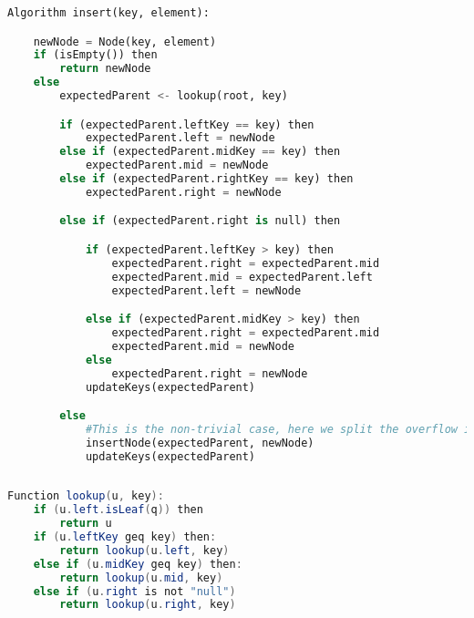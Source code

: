 \documentclass{report}
\begin{document}
\lstset{style=mystyle}
\begin{lstlisting}[language=Python]
Algorithm insert(key, element):

    newNode = Node(key, element)
    if (isEmpty()) then
        return newNode
    else
        expectedParent <- lookup(root, key)

        if (expectedParent.leftKey == key) then
            expectedParent.left = newNode
        else if (expectedParent.midKey == key) then
            expectedParent.mid = newNode
        else if (expectedParent.rightKey == key) then
            expectedParent.right = newNode

        else if (expectedParent.right is null) then

            if (expectedParent.leftKey > key) then
                expectedParent.right = expectedParent.mid
                expectedParent.mid = expectedParent.left
                expectedParent.left = newNode

            else if (expectedParent.midKey > key) then
                expectedParent.right = expectedParent.mid
                expectedParent.mid = newNode
            else
                expectedParent.right = newNode
            updateKeys(expectedParent)

        else
            #This is the non-trivial case, here we split the overflow into 2 nodes, and leave the smaller 2 at the current place, and carry on inserting upwards the tree recursively
            insertNode(expectedParent, newNode)
            updateKeys(expectedParent)
            
\end{lstlisting}
\begin{lstlisting}[language=Java]
Function lookup(u, key):
    if (u.left.isLeaf(q)) then
        return u
    if (u.leftKey geq key) then:
        return lookup(u.left, key)
    else if (u.midKey geq key) then:
        return lookup(u.mid, key)
    else if (u.right is not "null")
        return lookup(u.right, key)
\end{lstlisting}
\end{document}

